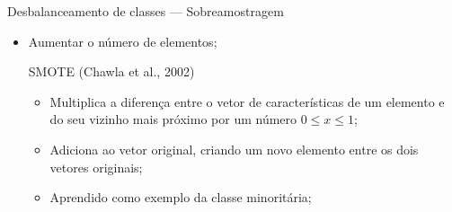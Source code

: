 \documentclass{beamer}
\begin{document}
\begin{frame}{Desbalanceamento de classes --- Sobreamostragem}
  \setlength\leftmargini{1em}
  \justifying
  \begin{itemize}
    \item Aumentar o número de elementos;
    \begin{block}{SMOTE (Chawla et al., 2002)}
      \setlength\leftmargini{1em}
      \begin{itemize}
        \item Multiplica a diferença entre o vetor de características de um elemento e do seu vizinho mais próximo por um número $0 \leq x \leq 1$;
        \item Adiciona ao vetor original, criando um novo elemento entre os dois vetores originais;
        \item Aprendido como exemplo da classe minoritária;
      \end{itemize}
    \end{block}
  \end{itemize}
\end{frame}
%
\end{document}
